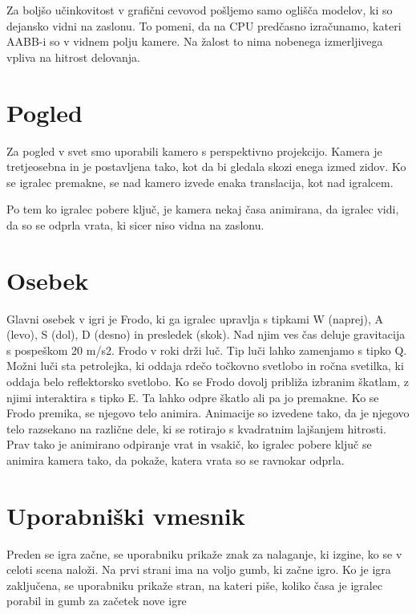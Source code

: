 \documentclass[a4paper,12pt]{article}
\begin{document}
Za boljšo učinkovitost v grafični cevovod pošljemo samo oglišča modelov, ki so dejansko vidni na zaslonu. To pomeni, da na CPU predčasno izračunamo, kateri AABB-i so v vidnem polju kamere. Na žalost to nima nobenega izmerljivega vpliva na hitrost delovanja.


\newpage

\section{Pogled}
\noindent Za pogled v svet smo uporabili kamero s perspektivno projekcijo. Kamera je tretjeosebna in je postavljena tako, kot da bi gledala skozi enega izmed zidov. Ko se igralec premakne, se nad kamero izvede enaka translacija, kot nad igralcem.

Po tem ko igralec pobere ključ, je kamera nekaj časa animirana, da igralec vidi, da so se odprla vrata, ki sicer niso vidna na zaslonu.

\newpage

\section{Osebek}
\noindent Glavni osebek v igri je Frodo, ki ga igralec upravlja s tipkami W (naprej), A (levo), S (dol), D (desno) in presledek (skok). Nad njim ves čas deluje gravitacija s pospeškom 20 m/s2. Frodo v roki drži luč. Tip luči lahko zamenjamo s tipko Q. Možni luči sta petrolejka, ki oddaja rdečo točkovno svetlobo in ročna svetilka, ki oddaja belo reflektorsko svetlobo. Ko se Frodo dovolj približa izbranim škatlam, z njimi interaktira s tipko E. Ta lahko odpre škatlo ali pa jo premakne.
Ko se Frodo premika, se njegovo telo animira. Animacije so izvedene tako, da je njegovo telo razsekano na različne dele, ki se rotirajo s kvadratnim lajšanjem hitrosti. Prav tako je animirano odpiranje vrat in vsakič, ko igralec pobere ključ se animira kamera tako, da pokaže, katera vrata so se ravnokar odprla.

\newpage

\section{Uporabniški vmesnik}
\noindent Preden se igra začne, se uporabniku prikaže znak za nalaganje, ki izgine, ko se v celoti scena naloži. Na prvi strani ima na voljo gumb, ki začne igro. Ko je igra zaključena, se uporabniku prikaže stran, na kateri piše, koliko časa je igralec porabil in gumb za začetek nove igre
\end{document}
